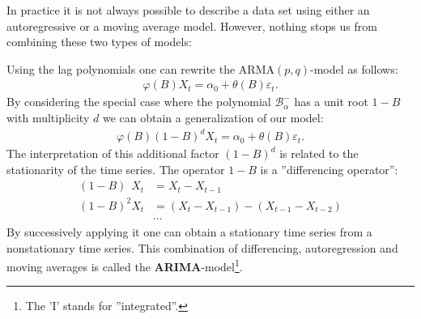 {    

    In practice it is not always possible to describe a data set using either an autoregressive or a moving average model. However, nothing stops us from combining these two types of models:

    Using the lag polynomials one can rewrite the ARMA$(p, q)$-model as follows:
    \begin{gather}
        \varphi(B)X_t = \alpha_0 + \theta(B)\varepsilon_t.
    \end{gather}
    By considering the special case where the polynomial $\mathcal{B}^-_\alpha$ has a unit root $1-B$ with multiplicity $d$ we can obtain a generalization of our model:
    \begin{gather}
        \varphi(B)(1-B)^dX_t = \alpha_0 + \theta(B)\varepsilon_t.
    \end{gather}
    The interpretation of this additional factor $(1-B)^d$ is related to the stationarity of the time series. The operator $1-B$ is a ''differencing operator'':
    \begin{align*}
        (1-B)\phantom{^2}X_t &= X_t - X_{t-1}\\
        (1-B)^2X_t &= (X_t-X_{t-1}) - (X_{t-1}-X_{t-2})\\
        &\cdots
    \end{align*}
    By successively applying it one can obtain a stationary time series from a nonstationary time series. This combination of differencing, autoregression and moving averages is called the \textbf{ARIMA}-model\footnote{The 'I' stands for ''integrated''.}.

}
